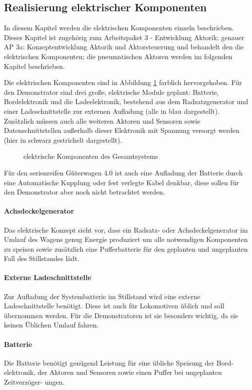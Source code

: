 \subsection{Realisierung elektrischer Komponenten}\label{sec:eKomp}
In diesem Kapitel werden die elektrischen Komponenten einzeln beschrieben. Dieses Kapitel ist zugehörig zum Arbeitspaket 3 - Entwicklung Aktorik; genauer AP 3a: Konzeptentwicklung Aktorik und Aktorsteuerung und behandelt den die elektrischen Komponenten; die pneumatischen Aktoren werden im folgenden Kapitel beschrieben.\par
Die elektrischen Komponenten sind in Abbildung \ref{fig:eKomp} farblich hervorgehoben.
Für den Demonstrator sind drei große, elektrische Module geplant: Batterie, Bordelektronik und die Ladeelektronik, bestehend aus dem Radsatzgenerator und einer Ladeschnittstelle zur externen Aufladung (alle in blau dargestellt). Zusätzlich müssen auch alle weiteren Aktoren und Sensoren sowie Datenschnittstellen außerhalb dieser Elektronik mit Spannung versorgt werden (hier in schwarz gestrichelt dargestellt).\par
\begin{figure}[hbt]
    \centering
    
    \caption{elektrische Komponenten des Gesamtsystems}
    \label{fig:eKomp}
\end{figure}
Für den serienreifen Güterwagen 4.0 ist auch eine Aufladung der Batterie durch eine Automatische Kupplung oder fest verlegte Kabel denkbar, diese sollen für den \gls{Demonstrator} aber noch nicht betrachtet werden.

\paragraph{Achsdeckelgenerator} \label{sec:RSG}
Das elektrische Konzept sieht vor, dass ein Radsatz- oder Achsdeckelgenerator im Umlauf des Wagens genug Energie produziert um alle notwendigen Komponenten zu speisen sowie zusätzlich eine Pufferbatterie für den geplanten und ungeplanten Fall des Stillstandes lädt.
\paragraph{Externe Ladeschnittstelle}
Zur Aufladung der Systembatterie im Stillstand wird eine externe Ladeschnittstelle benötigt. Diese ist auch für Lokomotiven üblich und soll übernommen werden. Für die Demonstratoren ist sie besonders wichtig, da sie keinen Üblichen Umlauf fahren.
\paragraph{Batterie}\label{sec:Batterie}
Die Batterie benötigt genügend Leistung für eine übliche Speisung der Bord- elektronik, der Aktoren und Sensoren sowie einen Puffer bei ungeplanten Zeitverzöger- ungen.
